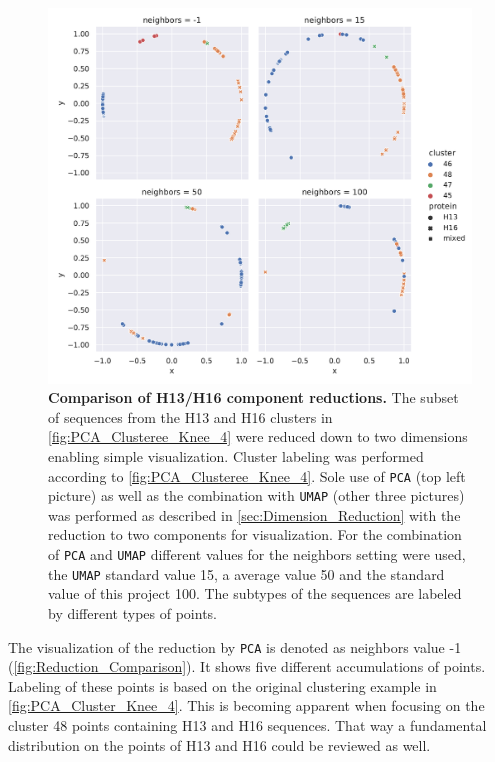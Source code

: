 \begin{figure}[!hbt]
    \centering
    \includegraphics[width=\textwidth]{PCA/Difference_Segment_4_H_metric_cosine.pdf}
    \caption[Comparison of H13/H16 component reductions]{\textbf{Comparison of H13/H16 component reductions.} The subset of sequences from the H13 and H16 clusters in \autoref{fig:PCA_Clusteree_Knee_4} were reduced down to two dimensions enabling simple visualization. Cluster labeling was performed according to \autoref{fig:PCA_Clusteree_Knee_4}. Sole use of \texttt{PCA} (top left picture) as well as the combination with \texttt{UMAP} (other three pictures) was performed as described in \autoref{sec:Dimension_Reduction} with the reduction to two components for visualization. For the combination of \texttt{PCA} and \texttt{UMAP} different values for the neighbors setting were used, the \texttt{UMAP} standard value 15, a average value 50 and the standard value of this project 100. The subtypes of the sequences are labeled by different types of points.}
    \label{fig:Reduction_Comparison}
\end{figure}

\vspace{1em}

The visualization of the reduction by \texttt{PCA} is denoted as neighbors value -1 (\autoref{fig:Reduction_Comparison}). It shows five different accumulations of points. Labeling of these points is based on the original clustering example in \autoref{fig:PCA_Cluster_Knee_4}. This is becoming apparent when focusing on the cluster 48 points containing H13 and H16 sequences. That way a fundamental distribution on the points of H13 and H16 could be reviewed as well. 

